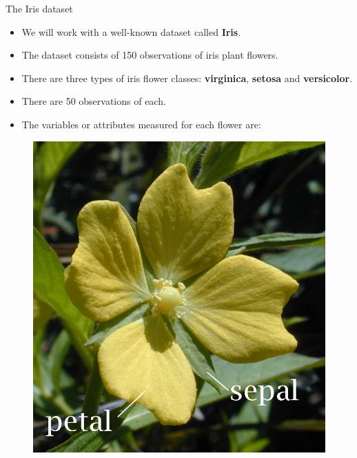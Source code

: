 \documentclass[handout]{beamer}
\begin{document}
\begin{frame}{The Iris dataset}
\scriptsize{
\begin{itemize}
 \item We will work with a well-known dataset called \textbf{Iris}.
 \item The dataset consists of 150 observations of iris plant flowers. 
 \item There are three types of iris flower classes: \textbf{virginica}, \textbf{setosa} and \textbf{versicolor}.
 \item There are 50 observations of each.
\item The variables or attributes measured for each flower are:


 
\end{itemize}


\begin{figure}[h!]
	\centering
	\includegraphics[scale=0.4]{pics/Petal-sepal.jpg}
	
	
\end{figure}

}

\end{frame}
\end{document}
